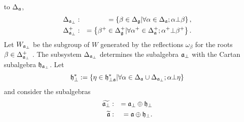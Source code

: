 \documentclass[12pt]{iopart}
\theoremstyle{definition}
\theoremstyle{definition}
\theoremstyle{definition}
\theoremstyle{definition}
\begin{document}
to $\Delta _{\frak{a}}$,
\begin{eqnarray*}
\Delta _{\frak{a}_{\perp }} &:&=\left\{ \beta \in \Delta _{\frak{g}}|\forall
\alpha \in \Delta _{\frak{a}};\alpha \bot \beta \right\} , \\
\Delta _{\frak{a}_{\perp }}^{+} &:&=\left\{ \beta ^{+}\in \Delta _{\frak{g}%
}^{+}|\forall \alpha ^{+}\in \Delta _{\frak{a}}^{+};\alpha ^{+}\bot \beta
^{+}\right\} .
\end{eqnarray*}
Let $W_{\frak{a}_{\perp }}$ be the subgroup of $W$ generated by the
reflections $\omega _{\beta }$ for the roots $\beta \in \Delta _{\frak{a}%
_{\perp }}^{+}$ . The subsystem $\Delta _{\frak{a}_{\perp }}$ determines the
subalgebra $\frak{a}_{\perp }$ with the Cartan subalgebra $\frak{h}_{\frak{a}%
_{\perp }}$. Let
\begin{equation*}
\frak{h}_{\perp }^{\ast }:=\left\{ \eta \in \frak{h}_{\perp \frak{a}}^{\ast
}|\forall \alpha \in \Delta _{\frak{a}}\cup \Delta _{\frak{a}_{\perp
}};\alpha \bot \eta \right\}
\end{equation*}
and consider the subalgebras
\begin{eqnarray*}
\widetilde{\frak{a}_{\perp }} &:&=\frak{a}_{\perp }\oplus \frak{h}_{\perp }
\\
\widetilde{\frak{a}} &:&=\frak{a}\oplus \frak{h}_{\perp }.
\end{eqnarray*}
\end{document}
